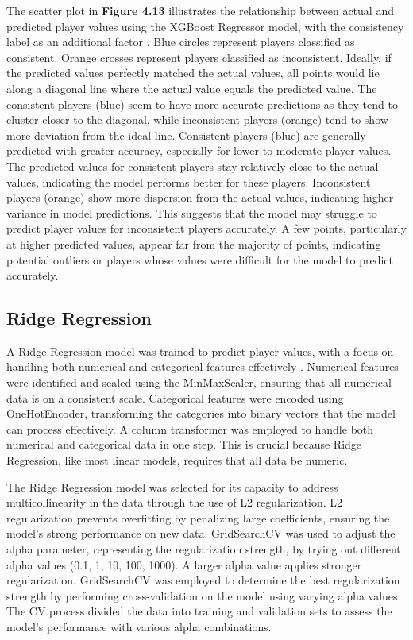 \documentclass[12pt, a4paper,oneside]{book}
\numberwithin{equation}{section}
\begin{document}
The scatter plot in \textbf{Figure 4.13} illustrates the relationship between actual and predicted player values using the XGBoost Regressor model, with the consistency label as an additional factor \cite{Bertini2006} \cite{chen2016}. Blue circles represent players classified as consistent. Orange crosses represent players classified as inconsistent. Ideally, if the predicted values perfectly matched the actual values, all points would lie along a diagonal line where the actual value equals the predicted value. The consistent players (blue) seem to have more accurate predictions as they tend to cluster closer to the diagonal, while inconsistent players (orange) tend to show more deviation from the ideal line. Consistent players (blue) are generally predicted with greater accuracy, especially for lower to moderate player values. The predicted values for consistent players stay relatively close to the actual values, indicating the model performs better for these players. Inconsistent players (orange) show more dispersion from the actual values, indicating higher variance in model predictions. This suggests that the model may struggle to predict player values for inconsistent players accurately. A few points, particularly at higher predicted values, appear far from the majority of points, indicating potential outliers or players whose values were difficult for the model to predict accurately.

\subsection{Ridge Regression}\label{sec:4.5.3}

A Ridge Regression model was trained to predict player values, with a focus on handling both numerical and categorical features effectively \cite{hoerl1970}. Numerical features were identified and scaled using the MinMaxScaler, ensuring that all numerical data is on a consistent scale. Categorical features were encoded using OneHotEncoder, transforming the categories into binary vectors that the model can process effectively. A column transformer was employed to handle both numerical and categorical data in one step. This is crucial because Ridge Regression, like most linear models, requires that all data be numeric. 

The Ridge Regression model was selected for its capacity to address multicollinearity in the data through the use of L2 regularization. L2 regularization prevents overfitting by penalizing large coefficients, ensuring the model's strong performance on new data. GridSearchCV was used to adjust the alpha parameter, representing the regularization strength, by trying out different alpha values (0.1, 1, 10, 100, 1000). A larger alpha value applies stronger regularization. GridSearchCV was employed to determine the best regularization strength by performing cross-validation on the model using varying alpha values. The CV process divided the data into training and validation sets to assess the model's performance with various alpha combinations.
\end{document}
